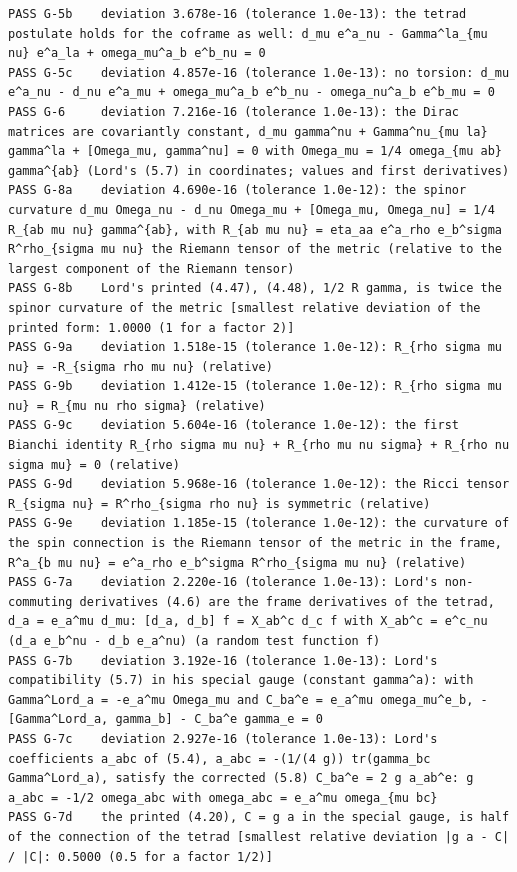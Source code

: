 \documentclass[
  10pt,
]{article}
\begin{document}
\begin{verbatim}
PASS G-5b    deviation 3.678e-16 (tolerance 1.0e-13): the tetrad postulate holds for the coframe as well: d_mu e^a_nu - Gamma^la_{mu nu} e^a_la + omega_mu^a_b e^b_nu = 0
PASS G-5c    deviation 4.857e-16 (tolerance 1.0e-13): no torsion: d_mu e^a_nu - d_nu e^a_mu + omega_mu^a_b e^b_nu - omega_nu^a_b e^b_mu = 0
PASS G-6     deviation 7.216e-16 (tolerance 1.0e-13): the Dirac matrices are covariantly constant, d_mu gamma^nu + Gamma^nu_{mu la} gamma^la + [Omega_mu, gamma^nu] = 0 with Omega_mu = 1/4 omega_{mu ab} gamma^{ab} (Lord's (5.7) in coordinates; values and first derivatives)
PASS G-8a    deviation 4.690e-16 (tolerance 1.0e-12): the spinor curvature d_mu Omega_nu - d_nu Omega_mu + [Omega_mu, Omega_nu] = 1/4 R_{ab mu nu} gamma^{ab}, with R_{ab mu nu} = eta_aa e^a_rho e_b^sigma R^rho_{sigma mu nu} the Riemann tensor of the metric (relative to the largest component of the Riemann tensor)
PASS G-8b    Lord's printed (4.47), (4.48), 1/2 R gamma, is twice the spinor curvature of the metric [smallest relative deviation of the printed form: 1.0000 (1 for a factor 2)]
PASS G-9a    deviation 1.518e-15 (tolerance 1.0e-12): R_{rho sigma mu nu} = -R_{sigma rho mu nu} (relative)
PASS G-9b    deviation 1.412e-15 (tolerance 1.0e-12): R_{rho sigma mu nu} = R_{mu nu rho sigma} (relative)
PASS G-9c    deviation 5.604e-16 (tolerance 1.0e-12): the first Bianchi identity R_{rho sigma mu nu} + R_{rho mu nu sigma} + R_{rho nu sigma mu} = 0 (relative)
PASS G-9d    deviation 5.968e-16 (tolerance 1.0e-12): the Ricci tensor R_{sigma nu} = R^rho_{sigma rho nu} is symmetric (relative)
PASS G-9e    deviation 1.185e-15 (tolerance 1.0e-12): the curvature of the spin connection is the Riemann tensor of the metric in the frame, R^a_{b mu nu} = e^a_rho e_b^sigma R^rho_{sigma mu nu} (relative)
PASS G-7a    deviation 2.220e-16 (tolerance 1.0e-13): Lord's non-commuting derivatives (4.6) are the frame derivatives of the tetrad, d_a = e_a^mu d_mu: [d_a, d_b] f = X_ab^c d_c f with X_ab^c = e^c_nu (d_a e_b^nu - d_b e_a^nu) (a random test function f)
PASS G-7b    deviation 3.192e-16 (tolerance 1.0e-13): Lord's compatibility (5.7) in his special gauge (constant gamma^a): with Gamma^Lord_a = -e_a^mu Omega_mu and C_ba^e = e_a^mu omega_mu^e_b, -[Gamma^Lord_a, gamma_b] - C_ba^e gamma_e = 0
PASS G-7c    deviation 2.927e-16 (tolerance 1.0e-13): Lord's coefficients a_abc of (5.4), a_abc = -(1/(4 g)) tr(gamma_bc Gamma^Lord_a), satisfy the corrected (5.8) C_ba^e = 2 g a_ab^e: g a_abc = -1/2 omega_abc with omega_abc = e_a^mu omega_{mu bc}
PASS G-7d    the printed (4.20), C = g a in the special gauge, is half of the connection of the tetrad [smallest relative deviation |g a - C| / |C|: 0.5000 (0.5 for a factor 1/2)]

\end{verbatim}
\end{document}
